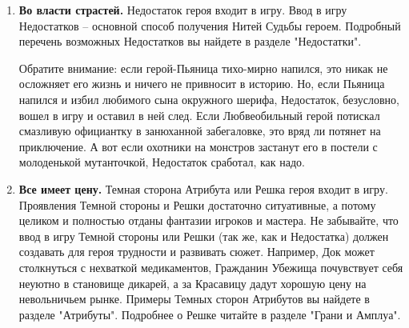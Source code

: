 \begin{enumerate}
    \item \textbf{Во власти страстей.}
    \newline Недостаток героя входит в игру. Ввод в игру Недостатков – основной способ получения Нитей Судьбы героем. Подробный перечень возможных Недостатков вы найдете в разделе "Недостатки". 
    \begin{tcolorbox}
        Обратите внимание: если герой-Пьяница тихо-мирно напился, это никак не осложняет его жизнь и ничего не привносит в историю. Но, если Пьяница напился и избил любимого сына окружного шерифа, Недостаток, безусловно, вошел в игру и оставил в ней след. Если Любвеобильный герой потискал смазливую официантку в занюханной забегаловке, это вряд ли потянет на приключение. А вот если охотники на монстров застанут его в постели с молоденькой мутанточкой, Недостаток сработал, как надо.
    \end{tcolorbox}

    \item \textbf{Все имеет цену.}
    \newline Темная сторона Атрибута или Решка героя входит в игру. Проявления Темной стороны и Решки достаточно ситуативные, а потому целиком и полностью отданы фантазии игроков и мастера. Не забывайте, что ввод в игру Темной стороны или Решки (так же, как и Недостатка) должен создавать для героя трудности и развивать сюжет. Например, Док может столкнуться с нехваткой медикаментов, Гражданин Убежища почувствует себя неуютно в становище дикарей, а за Красавицу дадут хорошую цену на невольничьем рынке.
    \newline Примеры Темных сторон Атрибутов вы найдете в разделе "Атрибуты". Подробнее о Решке читайте в разделе "Грани и Амплуа". 


\end{enumerate}
